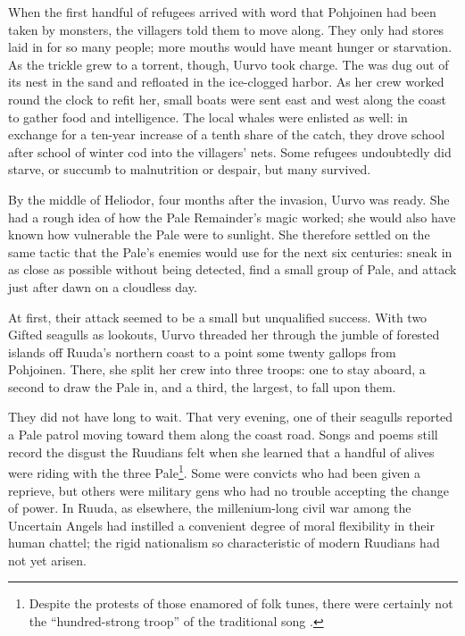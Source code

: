 \documentclass[12pt]{report}
\begin{document}
When the first handful of refugees arrived with word that Pohjoinen
had been taken by monsters, the villagers told them to move along.
They only had stores laid in for so many people; more mouths would
have meant hunger or starvation.  As the trickle grew to a torrent,
though, Uurvo took charge.  The  was dug out of its nest
in the sand and refloated in the ice-clogged harbor.  As her crew
worked round the clock to refit her, small boats were sent east and
west along the coast to gather food and intelligence.  The local
whales were enlisted as well: in exchange for a ten-year increase of a
tenth share of the catch, they drove school after school of winter cod
into the villagers' nets.  Some refugees undoubtedly did starve, or
succumb to malnutrition or despair, but many survived.

By the middle of Heliodor, four months after the invasion, Uurvo was
ready.  She had a rough idea of how the Pale Remainder's magic worked;
she would also have known how vulnerable the Pale were to sunlight.
She therefore settled on the same tactic that the Pale's enemies would
use for the next six centuries: sneak in as close as possible without
being detected, find a small group of Pale, and attack just after dawn
on a cloudless day.

At first, their attack seemed to be a small but unqualified success.
With two Gifted seagulls as lookouts, Uurvo threaded her 
through the jumble of forested islands off Ruuda's northern coast to a
point some twenty gallops from Pohjoinen.  There, she split her crew
into three troops: one to stay aboard, a second to draw the Pale in,
and a third, the largest, to fall upon them.

They did not have long to wait.  That very evening, one of their
seagulls reported a Pale patrol moving toward them along the coast
road.  Songs and poems still record the disgust the Ruudians felt when
she learned that a handful of alives were riding with the three
Pale\footnote{Despite the protests of those enamored of folk tunes,
there were certainly not the ``hundred-strong troop'' of the traditional
song .}.  Some were convicts who
had been given a reprieve, but others were military gens who had no
trouble accepting the change of power.  In Ruuda, as elsewhere, the
millenium-long civil war among the Uncertain Angels had instilled a
convenient degree of moral flexibility in their human chattel; the
rigid nationalism so characteristic of modern Ruudians had not yet
arisen.
\end{document}
